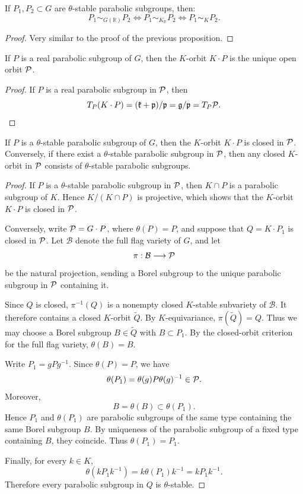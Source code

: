\begin{prop}
  If \(P_1,P_2\subset G\) are $\theta$-stable parabolic subgroups, then: 
    \[
    \boxed{
    P_1\sim_{G(\mathbb R)}P_2
    \iff
    P_1\sim_{K_{\mathbb R}}P_2
    \iff
    P_1\sim_K P_2 .
    }
    \]
\end{prop}

\begin{proof}
  Very similar to the proof of the previous proposition.
\end{proof}


\begin{prop}
  If $P$ is a real parabolic subgroup of $G$, then the $K$-orbit $K \cdot P$ is the unique open orbit $\mathcal{P}$.
\end{prop}

\begin{proof}
  If $P$ is a real parabolic subgroup in $\mathcal{P}$, then
  \[
    T_P (K \cdot P) = (\mathfrak{k} + \mathfrak{p})/\mathfrak{p} = \mathfrak{g}/\mathfrak{p} = T_P \mathcal{P}.
  \]
\end{proof}


\begin{prop}
  If $P$ is a $\theta$-stable parabolic subgroup of $G$, then the $K$-orbit $K \cdot P$ is closed in $\mathcal{P}$. Conversely, if there exist a $\theta$-stable parabolic subgroup in $\mathcal{P}$, then any closed $K$-orbit in $\mathcal{P}$ consists of $\theta$-stable parabolic subgroups.
\end{prop}

\begin{proof}
  If $P$ is a $\theta$-stable parabolic subgroup in $\mathcal{P}$, then $K \cap P$ is a parabolic subgroup of $K$. Hence $K/(K \cap P)$ is projective, which shows that the $K$-orbit $K \cdot P$ is closed in $\mathcal{P}$.

  Conversely, write $\mathcal{P}=G\cdot P$, where $\theta(P)=P$, and
suppose that $Q=K\cdot P_1$ is closed in $\mathcal{P}$.
Let $\mathcal B$ denote the full flag variety of $G$, and let
\[
  \pi:\mathcal B\longrightarrow\mathcal{P}
\]
be the natural projection, sending a Borel subgroup to the unique
parabolic subgroup in $\mathcal{P}$ containing it.

Since $Q$ is closed, $\pi^{-1}(Q)$ is a nonempty closed
$K$-stable subvariety of $\mathcal B$. It therefore contains a
closed $K$-orbit $\widetilde Q$. By $K$-equivariance,
$\pi(\widetilde Q)=Q$. Thus we may choose a Borel subgroup
$B\in\widetilde Q$ with $B\subset P_1$. By the closed-orbit
criterion for the full flag variety, $\theta(B)=B$.

Write $P_1=gPg^{-1}$. Since $\theta(P)=P$, we have
\[
  \theta(P_1)=\theta(g)P\theta(g)^{-1}\in\mathcal{P}.
\]
Moreover,
\[
  B=\theta(B)\subset\theta(P_1).
\]
Hence $P_1$ and $\theta(P_1)$ are parabolic subgroups of the same
type containing the same Borel subgroup $B$. By uniqueness of
the parabolic subgroup of a fixed type containing $B$, they
coincide. Thus $\theta(P_1)=P_1$.

Finally, for every $k\in K$,
\[
  \theta(kP_1k^{-1})
  =k\theta(P_1)k^{-1}
  =kP_1k^{-1}.
\]
Therefore every parabolic subgroup in $Q$ is $\theta$-stable.
\end{proof}



